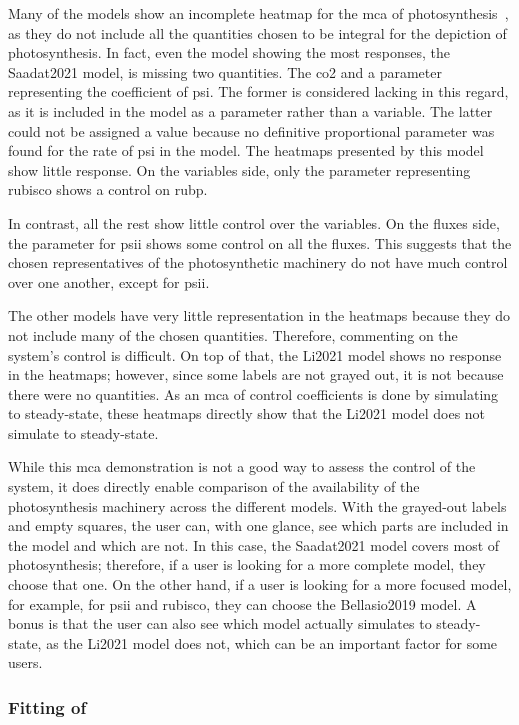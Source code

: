 Many of the models show an incomplete heatmap for the \gls{mca} of photosynthesis~, as they do not include all the quantities chosen to be integral for the depiction of photosynthesis. In fact, even the model showing the most responses, the Saadat2021 model, is missing two quantities. The \gls{co2} and a parameter representing the coefficient of \gls{psi}. The former is considered lacking in this regard, as it is included in the model as a parameter rather than a variable. The latter could not be assigned a value because no definitive proportional parameter was found for the rate of \gls{psi} in the model. The heatmaps presented by this model show little response. On the variables side, only the parameter representing \gls{rubisco} shows a control on \gls{rubp}.

In contrast, all the rest show little control over the variables. On the fluxes side, the parameter for \gls{psii} shows some control on all the fluxes. This suggests that the chosen representatives of the photosynthetic machinery do not have much control over one another, except for \gls{psii}.

The other models have very little representation in the heatmaps because they do not include many of the chosen quantities. Therefore, commenting on the system's control is difficult. On top of that, the Li2021 model shows no response in the heatmaps; however, since some labels are not grayed out, it is not because there were no quantities. As an \gls{mca} of control coefficients is done by simulating to steady-state, these heatmaps directly show that the Li2021 model does not simulate to steady-state.

While this \gls{mca} demonstration is not a good way to assess the control of the system, it does directly enable comparison of the availability of the photosynthesis machinery across the different models. With the grayed-out labels and empty squares, the user can, with one glance, see which parts are included in the model and which are not. In this case, the Saadat2021 model covers most of photosynthesis; therefore, if a user is looking for a more complete model, they choose that one. On the other hand, if a user is looking for a more focused model, for example, for \gls{psii} and \gls{rubisco}, they can choose the Bellasio2019 model. A bonus is that the user can also see which model actually simulates to steady-state, as the Li2021 model does not, which can be an important factor for some users.

\subsubsection{Fitting of }

